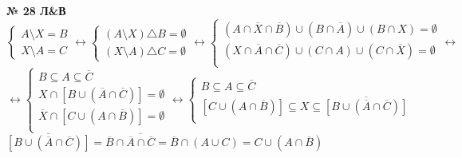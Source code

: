 \documentclass[12pt]{article}
\begin{document}
\vspace{.5cm}
{
	{\textbf{№ 28 Л\&В} \vspace{.5cm}\\}
	\begin{equation*}
		\begin{cases}
			A \setminus	X = B\\
			X \setminus A = C
		\end{cases} \leftrightarrow
		\begin{cases}
			(A \setminus X) \triangle B = \emptyset\\
			(X \setminus A) \triangle C = \emptyset
		\end{cases} \leftrightarrow
		\begin{cases}
			(A \cap \overline{X} \cap \overline{B}) \cup (B \cap \overline{A}) \cup (B \cap X) = \emptyset\\
			(X \cap \overline{A} \cap \overline{C}) \cup (C \cap A) \cup (C \cap \overline{X})  = \emptyset\\
		\end{cases}\leftrightarrow
	\end{equation*}
	\begin{equation*}
		\leftrightarrow
		\begin{cases}
			B \subseteq A \subseteq \overline{C}\\
			X \cap [B \cup (\overline{A} \cap \overline{C})] = \emptyset\\
			\overline{X} \cap [C \cup (A \cap \overline{B})] = \emptyset\\
		\end{cases}
			\leftrightarrow
	\begin{cases}
		B \subseteq A \subseteq \overline{C}\\
		[C \cup (A \cap \overline{B})] \subseteq X \subseteq \overline{[B \cup (\overline{A} \cap \overline{C})]}\\
	\end{cases}
	\end{equation*}
	$\overline{[B \cup (\overline{A} \cap \overline{C})]} = \overline{B} \cap \overline{\overline{A} \cap \overline{C}} = \overline{B} \cap (A \cup C) = C \cup (A \cap \overline{B})$
	}
\end{document}
